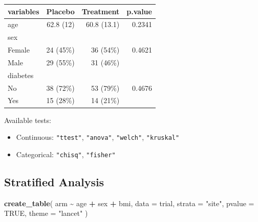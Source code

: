 \documentclass[
]{article}
\newenvironment{Shaded}{\begin{snugshade}}{\end{snugshade}}
\newcommand{\AttributeTok}[1]{\textcolor[rgb]{0.13,0.29,0.53}{#1}}
\newcommand{\ConstantTok}[1]{\textcolor[rgb]{0.56,0.35,0.01}{#1}}
\newcommand{\FunctionTok}[1]{\textcolor[rgb]{0.13,0.29,0.53}{\textbf{#1}}}
\newcommand{\NormalTok}[1]{#1}
\newcommand{\SpecialCharTok}[1]{\textcolor[rgb]{0.81,0.36,0.00}{\textbf{#1}}}
\newcommand{\StringTok}[1]{\textcolor[rgb]{0.31,0.60,0.02}{#1}}
\providecommand{\tightlist}{%
  \setlength{\itemsep}{0pt}\setlength{\parskip}{0pt}}
\begin{document}
\begin{tabular}{lrrr}
\hline
variables & Placebo & Treatment & p.value \\
\hline
age & 62.8 (12) & 60.8 (13.1) & 0.2341 \\
sex &  &  &  \\
\hspace{1em}Female & 24 (45\%) & 36 (54\%) & 0.4621 \\
\hspace{1em}Male & 29 (55\%) & 31 (46\%) &  \\
diabetes &  &  &  \\
\hspace{1em}No & 38 (72\%) & 53 (79\%) & 0.4676 \\
\hspace{1em}Yes & 15 (28\%) & 14 (21\%) &  \\
\hline
\end{tabular}

Available tests:

\begin{itemize}
\tightlist
\item
  Continuous: \texttt{"ttest"}, \texttt{"anova"}, \texttt{"welch"},
  \texttt{"kruskal"}
\item
  Categorical: \texttt{"chisq"}, \texttt{"fisher"}
\end{itemize}

\subsection{Stratified Analysis}\label{stratified-analysis}

\begin{Shaded}
\begin{Highlighting}[]
\FunctionTok{create\_table}\NormalTok{(}
\NormalTok{  arm }\SpecialCharTok{\textasciitilde{}}\NormalTok{ age }\SpecialCharTok{+}\NormalTok{ sex }\SpecialCharTok{+}\NormalTok{ bmi,}
  \AttributeTok{data =}\NormalTok{ trial,}
  \AttributeTok{strata =} \StringTok{"site"}\NormalTok{,}
  \AttributeTok{pvalue =} \ConstantTok{TRUE}\NormalTok{,}
  \AttributeTok{theme =} \StringTok{"lancet"}
\NormalTok{)}
\end{Highlighting}
\end{Shaded}
\end{document}
